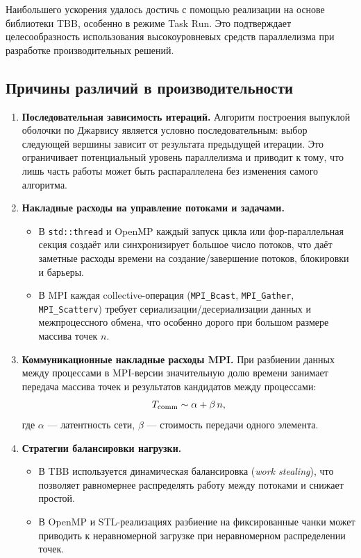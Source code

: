 \documentclass[12pt,a4paper]{article}
\begin{document}
Наибольшего ускорения удалось достичь с помощью реализации на основе библиотеки TBB, особенно в режиме Task Run. Это подтверждает целесообразность использования высокоуровневых средств параллелизма при разработке производительных решений.

\subsection*{Причины различий в производительности}
\begin{enumerate}
  \item \textbf{Последовательная зависимость итераций.}  
    Алгоритм построения выпуклой оболочки по Джарвису является условно последовательным: выбор следующей вершины зависит от результата предыдущей итерации. Это ограничивает потенциальный уровень параллелизма и приводит к тому, что лишь часть работы может быть распараллелена без изменения самого алгоритма.
  
  \item \textbf{Накладные расходы на управление потоками и задачами.}  
    \begin{itemize}
      \item В \texttt{std::thread} и OpenMP каждый запуск цикла или фор-параллельная секция создаёт или синхронизирует большое число потоков, что даёт заметные расходы времени на создание/завершение потоков, блокировки и барьеры.  
      \item В MPI каждая collective-операция (\texttt{MPI\_Bcast}, \texttt{MPI\_Gather}, \texttt{MPI\_Scatterv}) требует сериализации/десериализации данных и межпроцессного обмена, что особенно дорого при большом размере массива точек \(n\).
    \end{itemize}

  \item \textbf{Коммуникационные накладные расходы MPI.}  
    При разбиении данных между процессами в MPI-версии значительную долю времени занимает передача массива точек и результатов кандидатов между процессами:
    \[
      T_{\rm comm} \sim \alpha + \beta \, n,
    \]
    где \(\alpha\) — латентность сети, \(\beta\) — стоимость передачи одного элемента. 

  \item \textbf{Стратегии балансировки нагрузки.}  
    \begin{itemize}
      \item В TBB используется динамическая балансировка (\emph{work stealing}), что позволяет равномернее распределять работу между потоками и снижает простой.  
      \item В OpenMP и STL-реализациях разбиение на фиксированные чанки может приводить к неравномерной загрузке при неравномерном распределении точек.
    \end{itemize}


\end{enumerate}
\end{document}
